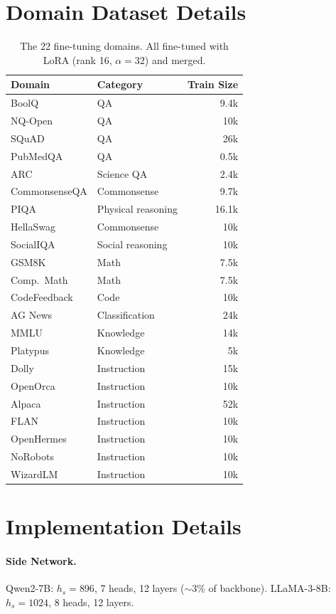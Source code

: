 \documentclass[11pt]{article}
\begin{document}
\section{Domain Dataset Details}
\label{app:domains}

\begin{table}[h]
\centering
\small
\begin{tabular}{@{}llr@{}}
\toprule
\textbf{Domain} & \textbf{Category} & \textbf{Train Size} \\
\midrule
BoolQ & QA & 9.4k \\
NQ-Open & QA & 10k \\
SQuAD & QA & 26k \\
PubMedQA & QA & 0.5k \\
ARC & Science QA & 2.4k \\
CommonsenseQA & Commonsense & 9.7k \\
PIQA & Physical reasoning & 16.1k \\
HellaSwag & Commonsense & 10k \\
SocialIQA & Social reasoning & 10k \\
GSM8K & Math & 7.5k \\
Comp.\ Math & Math & 7.5k \\
CodeFeedback & Code & 10k \\
AG News & Classification & 24k \\
MMLU & Knowledge & 14k \\
Platypus & Knowledge & 5k \\
Dolly & Instruction & 15k \\
OpenOrca & Instruction & 10k \\
Alpaca & Instruction & 52k \\
FLAN & Instruction & 10k \\
OpenHermes & Instruction & 10k \\
NoRobots & Instruction & 10k \\
WizardLM & Instruction & 10k \\
\bottomrule
\end{tabular}
\caption{The 22 fine-tuning domains. All fine-tuned with LoRA (rank 16, $\alpha{=}32$) and merged.}
\label{tab:domains}
\end{table}

\section{Implementation Details}
\label{app:implementation}

\paragraph{Side Network.} Qwen2-7B: $h_s{=}896$, 7 heads, 12 layers ($\sim$3\% of backbone). LLaMA-3-8B: $h_s{=}1024$, 8 heads, 12 layers.
\end{document}
